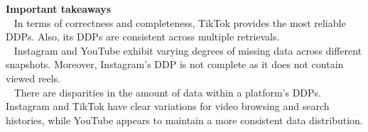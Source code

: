 \noindent
\textbf{Important takeaways}\\ %
\noindent
\faHandPointRight~ In terms of correctness and completeness, TikTok provides the most reliable DDPs. Also, its DDPs are consistent across multiple retrievals.\\
\noindent
\faHandPointRight~ Instagram and YouTube exhibit varying degrees of missing data across different snapshots. Moreover, Instagram's DDP is not complete as it does not contain viewed reels.\\
\noindent
\faHandPointRight~ There are disparities in the amount of data within a platform's DDPs. Instagram and TikTok have clear variations for video browsing and search histories, while YouTube appears to maintain a more consistent data distribution.